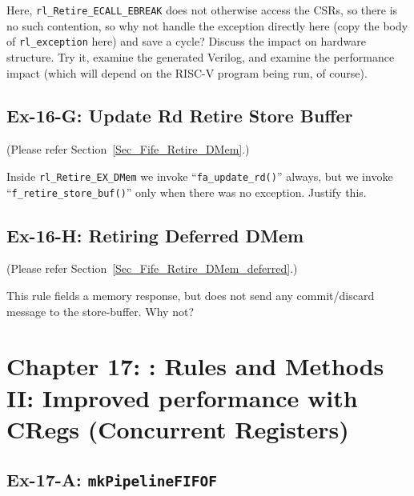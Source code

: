 \vspace{1ex}

Here, \verb|rl_Retire_ECALL_EBREAK| does not otherwise access the
CSRs, so there is no such contention, so why not handle the exception
directly here (copy the body of \verb|rl_exception| here) and save a
cycle?  Discuss the impact on hardware structure.  Try it, examine the
generated Verilog, and examine the performance impact (which will
depend on the RISC-V program being run, of course).


\subsection*{Ex-16-G: Update Rd {\vs} Retire Store Buffer}
\label{Ex-16-G-Rd-vs-Store-Buffer}

(Please refer Section~\ref{Sec_Fife_Retire_DMem}.)

Inside \verb|rl_Retire_EX_DMem| we invoke ``\verb|fa_update_rd()|''
always, but we invoke ``\verb|f_retire_store_buf()|'' only when there
was no exception.  Justify this.


\subsection*{Ex-16-H: Retiring Deferred DMem}
\label{Ex-16-H-Retiring Deferred DMem}

(Please refer Section~\ref{Sec_Fife_Retire_DMem_deferred}.)

This rule fields a memory response, but does not send any
commit/discard message to the store-buffer.  Why not?


\hdivider

\section*{Chapter 17: {\BSV}: Rules and Methods II: Improved performance with CRegs (Concurrent Registers)}


\subsection*{Ex-17-A: {\tt mkPipelineFIFOF}}
\label{Ex-17-A-PipelineFIFOs}

